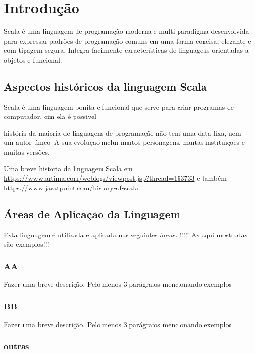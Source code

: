 

\chapter{ Introdu\c{c}\~{a}o}

Scala é uma linguagem de programação moderna e multi-paradigma desenvolvida para expressar padrões de programação comuns em uma forma concisa, elegante e com tipagem segura. Integra facilmente características de linguagens orientadas a objetos e funcional.

   \section{Aspectos hist\'{o}ricos da linguagem Scala}
    
    Scala é uma linguagem bonita e funcional que serve para criar programas de computador, cim ela é possivel



    


     hist\'{o}ria da maioria de linguagens de programa\c{c}\~{a}o n\~{a}o tem uma data fixa, nem um autor \'{u}nico. A sua evolu\c{c}\~{a}o inclui muitos personagens, muitas institui\c{c}\~{o}es e muitas vers\~{o}es.

Uma breve historia da linguagem Scala em \url{https://www.artima.com/weblogs/viewpost.jsp?thread=163733}  e tamb\'{e}m \url{https://www.javatpoint.com/history-of-scala}


   \section{\'{A}reas de Aplica\c{c}\~{a}o da Linguagem}
   Esta linguagem \'{e} utilizada e aplicada nas seguintes \'{a}reas: !!!!! As aqui mostradas s\~{a}o exemplos!!!

        \subsection{ AA}
        Fazer uma breve descri\c{c}\~{a}o. Pelo menos 3 par\'{a}grafos mencionando exemplos

        \subsection{ BB}
        Fazer uma breve descri\c{c}\~{a}o. Pelo menos 3 par\'{a}grafos mencionando exemplos

        \subsection{ outras} 

        
